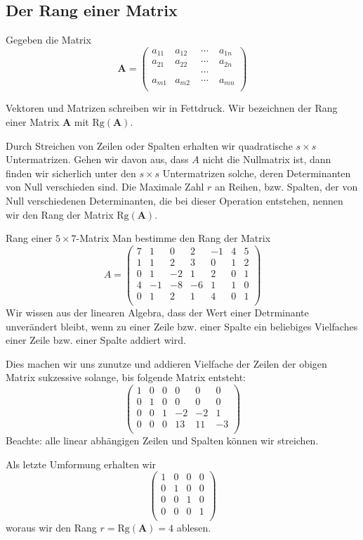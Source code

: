 \subsection{Der Rang einer Matrix}
Gegeben die Matrix
\begin{equation}
  \mathbf{A}=
  \begin{pmatrix}
    a_{11}&a_{12}&\;\cdots\;&a_{1n}\\
    a_{21}&a_{22}&\;\cdots\;&a_{2n}\\
    & &\;\cdots\;&\\
    a_{m1}&a_{m2}&\;\cdots\;&a_{mn}\\
  \end{pmatrix}
  \label{eq:Matrixmn}
\end{equation}
\begin{note}{}
  Vektoren und Matrizen schreiben wir in Fettdruck. Wir bezeichnen der Rang
  einer Matrix $\mathbf{A}$ mit $\text{Rg}(\mathbf{A})$.
\end{note}
Durch Streichen von Zeilen oder Spalten erhalten wir quadratische $s\times s$
Untermatrizen. Gehen wir davon aus, dass $A$ nicht die Nullmatrix ist, dann finden
wir sicherlich unter den $s\times s$ Untermatrizen solche, deren Determinanten
von Null verschieden sind. Die Maximale Zahl $r$ an Reihen, bzw.  Spalten, der
von Null verschiedenen Determinanten, die bei dieser Operation entstehen,
nennen wir den Rang der Matrix $\text{Rg}(\mathbf{A})$.
\begin{example}{Rang einer $5\times7$-Matrix}
  Man bestimme den Rang der Matrix
  \[
    A=\begin{pmatrix}
    7&1&0&2&-1&4&5\\
    1&1&2&3& 0&1&2\\
    0&1&-2&1&2&0&1\\
    4&-1&-8&-6&1&1&0\\
    0&1&2&1&4&0&1\\
    \end{pmatrix}
  \]
  Wir wissen aus der linearen Algebra, dass der Wert einer Detrminante
  unverändert bleibt, wenn zu einer Zeile bzw. einer Spalte ein beliebiges
  Vielfaches einer Zeile bzw. einer Spalte addiert wird.

  Dies machen wir uns zunutze und addieren Vielfache der Zeilen der obigen
  Matrix sukzessive solange, bis folgende Matrix entsteht: 
  \[
    \begin{pmatrix}
    1&0&0&0&0&0\\
    0&1&0&0&0&0\\
    0&0&1&-2&-2&1\\
    0&0&0&13&11&-3\\
    \end{pmatrix}
  \]
  Beachte: alle linear abhängigen Zeilen und Spalten können wir streichen. 
  
  Als letzte Umformung erhalten wir
  \[
     \begin{pmatrix}
    1&0&0&0\\
    0&1&0&0\\
    0&0&1&0\\
    0&0&0&1\\
    \end{pmatrix}
  \]
  woraus wir den Rang $r=\text{Rg}(\mathbf{A})=4$ ablesen.
\end{example}
